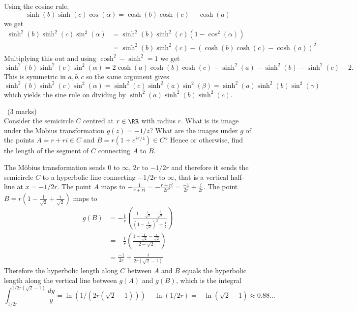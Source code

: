 \documentclass[12pt]{article}
\begin{document}
\begin{answer}
  Using the cosine rule,
  \[\sinh(b)\sinh(c)\cos(\alpha)=\cosh(b)\cosh(c)-\cosh(a)\]
  we get
  \begin{align*}
    \sinh^2(b)\sinh^2(c)\sin^2(\alpha)&=\sinh^2(b)\sinh^2(c)(1-\cos^2(\alpha))\\
    &=\sinh^2(b)\sinh^2(c)-(\cosh(b)\cosh(c)-\cosh(a))^2
  \end{align*}
  Multiplying this out and using $\cosh^2-\sinh^2=1$ we get
  \[\sinh^2(b)\sinh^2(c)\sin^2(\alpha)=2\cosh(a)\cosh(b)\cosh(c)-\sinh^2(a)-\sinh^2(b)-\sinh^2(c)-2.\]
  This is symmetric in $a,b,c$ so the same argument gives
  \[\sinh^2(b)\sinh^2(c)\sin^2(\alpha)=\sinh^2(c)\sinh^2(a)\sin^2(\beta)=\sinh^2(a)\sinh^2(b)\sin^2(\gamma)\]
  which yields the sine rule on dividing by $\sinh^2(a)\sinh^2(b)\sinh^2(c)$.
\end{answer}
\newpage

\vspace{1cm}

\begin{question}\ (3 marks)\\
Consider the semicircle $C$ centred at $r\in\RR$ with radius $r$. What is its image under the M\"obius transformation $g(z)=-1/z$? What are the images under $g$ of the points $A=r+ri\in C$ and $B=r(1+e^{i\pi/4})\in C$? Hence or otherwise, find the length of the segment of $C$ connecting $A$ to $B$.
\end{question}

\begin{answer}
  The M\"obius transformation sends $0$ to $\infty$, $2r$ to $-1/2r$ and therefore it sends the semicircle $C$ to a hyperbolic line connecting $-1/2r$ to $\infty$, that is a vertical half-line at $x=-1/2r$. The point $A$ maps to $-\frac{1}{r+ri}=-\frac{r-ri}{2r^2}=\frac{-1}{2r}+\frac{i}{2r}$. The point $B=r\left(1-\frac{1}{\sqrt{2}}+\frac{i}{\sqrt{2}}\right)$ maps to
  \begin{align*}
    g(B)&=-\frac{1}{r}\left(\frac{1-\frac{1}{\sqrt{2}}-\frac{i}{\sqrt{2}}}{\left(1-\frac{1}{\sqrt{2}}\right)^2+\frac{1}{2}}\right)\\
    &=-\frac{1}{r}\left(\frac{1-\frac{1}{\sqrt{2}}-\frac{i}{\sqrt{2}}}{2-\sqrt{2}}\right)\\
    &=\frac{-1}{2r}+\frac{i}{2r(\sqrt{2}-1)}
  \end{align*}
  Therefore the hyperbolic length along $C$ between $A$ and $B$ equals the hyperbolic length along the vertical line between $g(A)$ and $g(B)$, which is the integral
  \[\int_{1/2r}^{1/2r(\sqrt{2}-1)}\frac{dy}{y}=\ln(1/(2r(\sqrt{2}-1)))-\ln(1/2r)=-\ln(\sqrt{2}-1)\approx 0.88...\]
\end{answer}
\newpage
\end{document}
